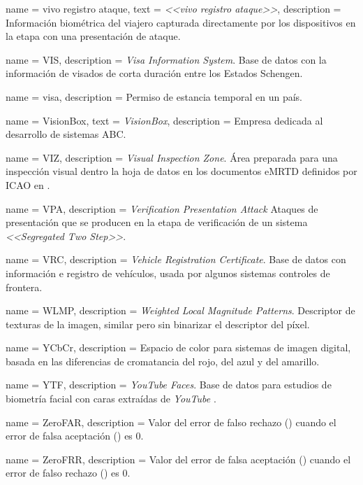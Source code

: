 {
    name        = {vivo registro ataque},
    text        = {\textit{<<vivo registro ataque>>}},
    description = {Información biométrica del viajero capturada directamente por los dispositivos  en la etapa  con una presentación de ataque.}
}

{
    name        = VIS,
    description = {\textit{Visa Information System}. Base de datos con la información de visados de corta duración entre los Estados Schengen.}
}

{
    name        = {visa},
    description = {Permiso de estancia temporal en un país.}
}

{
    name        = {VisionBox},
    text        = {\textit{VisionBox}},
    description = {Empresa dedicada al desarrollo de sistemas ABC.}
}

{
    name        = {VIZ},
    description = {\textit{Visual Inspection Zone}. Área preparada para una inspección visual dentro la hoja de datos en los documentos \gls{eMRTD} definidos por \gls{ICAO} en \cite{doc20069303}.}
}

{
    name        = {VPA},
    description = {\textit{Verification Presentation Attack} Ataques de presentación que se producen en la etapa de verificación de un sistema  \textit{<<Segregated Two Step>>}.}
}

{
    name        = {VRC},
    description = {\textit{Vehicle Registration Certificate}. Base de datos con información e registro de vehículos, usada por algunos sistemas controles de frontera.}
}

{
    name        = {WLMP},
    description = {\textit{Weighted Local Magnitude Patterns}. Descriptor de texturas de la imagen, similar  pero sin binarizar el descriptor del píxel.}
}

{
    name        = {YCbCr},
    description = {Espacio de color para sistemas de imagen digital, basada en las diferencias de cromatancia del rojo, del azul y del amarillo.}
}

{
    name        = {YTF},
    description = {\textit{YouTube Faces}. Base de datos para estudios de biometría facial con caras extraídas de \textit{YouTube} \cite{wolf2011face}.}
}

{
    name        = {ZeroFAR},
    description = {Valor del error de falso rechazo () cuando el error de falsa aceptación () es $0$.}
}

{
    name        = {ZeroFRR},
    description = {Valor del error de falsa aceptación () cuando el error de falso rechazo () es $0$.}
}
